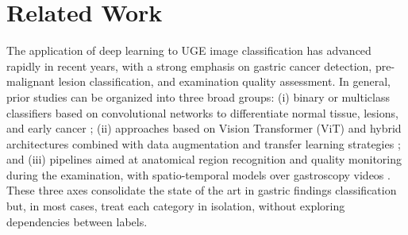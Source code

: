 \documentclass[12pt]{article}
\begin{document}


\section{Related Work}
\label{sec:Related-Work}

The application of deep learning to UGE image classification has advanced rapidly in recent years, with a strong emphasis on gastric cancer detection, pre-malignant lesion classification, and examination quality assessment. In general, prior studies can be organized into three broad groups: (i) binary or multiclass classifiers based on convolutional networks to differentiate normal tissue, lesions, and early cancer \cite{10078850}; (ii) approaches based on Vision Transformer (ViT) and hybrid architectures combined with data augmentation and transfer learning strategies \cite{10078850}; and (iii) pipelines aimed at anatomical region recognition and quality monitoring during the examination, with spatio-temporal models over gastroscopy videos \cite{Bravo2023}. These three axes consolidate the state of the art in gastric findings classification but, in most cases, treat each category in isolation, without exploring dependencies between labels.
\end{document}
